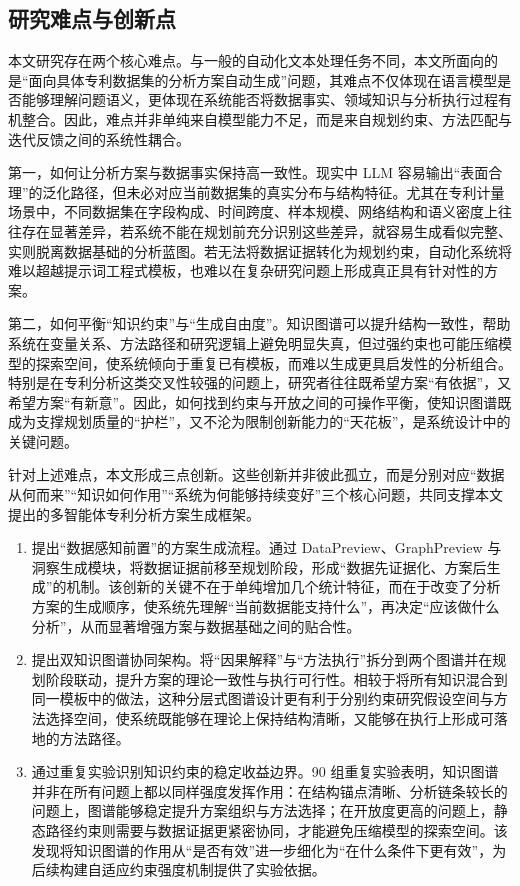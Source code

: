 \subsection{研究难点与创新点}

本文研究存在两个核心难点。与一般的自动化文本处理任务不同，本文所面向的是“面向具体专利数据集的分析方案自动生成”问题，其难点不仅体现在语言模型是否能够理解问题语义，更体现在系统能否将数据事实、领域知识与分析执行过程有机整合。因此，难点并非单纯来自模型能力不足，而是来自规划约束、方法匹配与迭代反馈之间的系统性耦合。

第一，如何让分析方案与数据事实保持高一致性。现实中 LLM 容易输出“表面合理”的泛化路径，但未必对应当前数据集的真实分布与结构特征。尤其在专利计量场景中，不同数据集在字段构成、时间跨度、样本规模、网络结构和语义密度上往往存在显著差异，若系统不能在规划前充分识别这些差异，就容易生成看似完整、实则脱离数据基础的分析蓝图。若无法将数据证据转化为规划约束，自动化系统将难以超越提示词工程式模板，也难以在复杂研究问题上形成真正具有针对性的方案。

第二，如何平衡“知识约束”与“生成自由度”。知识图谱可以提升结构一致性，帮助系统在变量关系、方法路径和研究逻辑上避免明显失真，但过强约束也可能压缩模型的探索空间，使系统倾向于重复已有模板，而难以生成更具启发性的分析组合。特别是在专利分析这类交叉性较强的问题上，研究者往往既希望方案“有依据”，又希望方案“有新意”。因此，如何找到约束与开放之间的可操作平衡，使知识图谱既成为支撑规划质量的“护栏”，又不沦为限制创新能力的“天花板”，是系统设计中的关键问题。

针对上述难点，本文形成三点创新。这些创新并非彼此孤立，而是分别对应“数据从何而来”“知识如何作用”“系统为何能够持续变好”三个核心问题，共同支撑本文提出的多智能体专利分析方案生成框架。

\begin{enumerate}[(1)]
\item 提出“数据感知前置”的方案生成流程。通过 DataPreview、GraphPreview 与洞察生成模块，将数据证据前移至规划阶段，形成“数据先证据化、方案后生成”的机制。该创新的关键不在于单纯增加几个统计特征，而在于改变了分析方案的生成顺序，使系统先理解“当前数据能支持什么”，再决定“应该做什么分析”，从而显著增强方案与数据基础之间的贴合性。
\item 提出双知识图谱协同架构。将“因果解释”与“方法执行”拆分到两个图谱并在规划阶段联动，提升方案的理论一致性与执行可行性。相较于将所有知识混合到同一模板中的做法，这种分层式图谱设计更有利于分别约束研究假设空间与方法选择空间，使系统既能够在理论上保持结构清晰，又能够在执行上形成可落地的方法路径。
\item 通过重复实验识别知识约束的稳定收益边界。90 组重复实验表明，知识图谱并非在所有问题上都以同样强度发挥作用：在结构锚点清晰、分析链条较长的问题上，图谱能够稳定提升方案组织与方法选择；在开放度更高的问题上，静态路径约束则需要与数据证据更紧密协同，才能避免压缩模型的探索空间。该发现将知识图谱的作用从“是否有效”进一步细化为“在什么条件下更有效”，为后续构建自适应约束强度机制提供了实验依据。
\end{enumerate}

